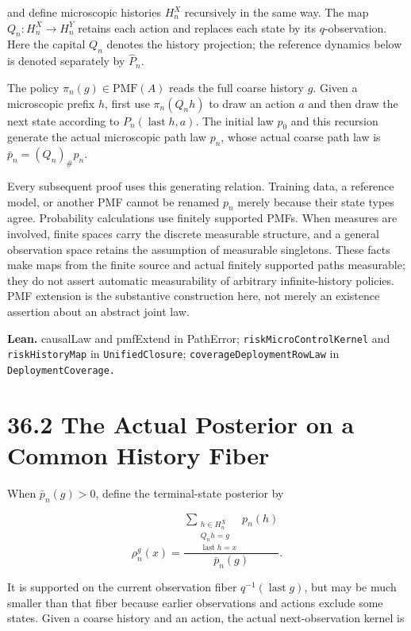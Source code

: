 \documentclass[
  english,
  11pt,
  oneside]{book}
\begin{document}
and define microscopic histories \(H_n^X\) recursively in the same way. The map \(Q_n:H_n^X\to H_n^Y\) retains each action and replaces each state by its \(q\)-observation. Here the capital \(Q_n\) denotes the history projection; the reference dynamics below is denoted separately by \(\widehat P_n\).

The policy \(\pi_n(g)\in\mathrm{PMF}(A)\) reads the full coarse history \(g\). Given a microscopic prefix \(h\), first use \(\pi_n(Q_nh)\) to draw an action \(a\) and then draw the next state according to \(P_n(\operatorname{last}h,a)\). The initial law \(p_0\) and this recursion generate the actual microscopic path law \(p_n\), whose actual coarse path law is \(\bar p_n=(Q_n)_\#p_n\).

Every subsequent proof uses this generating relation. Training data, a reference model, or another PMF cannot be renamed \(p_n\) merely because their state types agree. Probability calculations use finitely supported PMFs. When measures are involved, finite spaces carry the discrete measurable structure, and a general observation space retains the assumption of measurable singletons. These facts make maps from the finite source and actual finitely supported paths measurable; they do not assert automatic measurability of arbitrary infinite-history policies. PMF extension is the substantive construction here, not merely an existence assertion about an abstract joint law.

\textbf{Lean.} causalLaw and pmfExtend in PathError; \nolinkurl{riskMicroControlKernel} and \nolinkurl{riskHistoryMap} in \nolinkurl{UnifiedClosure}; \nolinkurl{coverageDeploymentRowLaw} in \nolinkurl{DeploymentCoverage.}

\section{36.2 The Actual Posterior on a Common History Fiber}\label{the-actual-posterior-on-a-common-history-fiber}

When \(\bar p_n(g)>0\), define the terminal-state posterior by

\[\rho_n^g(x)=
\frac{\displaystyle\sum_{\substack{h\in H_n^X\\Q_nh=g\\\operatorname{last}h=x}}p_n(h)}
{\bar p_n(g)}.\]

It is supported on the current observation fiber \(q^{-1}(\operatorname{last}g)\), but may be much smaller than that fiber because earlier observations and actions exclude some states. Given a coarse history and an action, the actual next-observation kernel is
\end{document}
